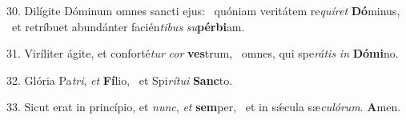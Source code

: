 30. Dilígite Dóminum omnes sancti ejus: \dag\  quóniam veritátem re\textit{quí}\textit{ret} \textbf{Dó}minus, \ast\  et retríbuet abundánter facién\textit{ti}\textit{bus} \textit{su}\textbf{pér}\textbf{bi}am.\

31. Viríliter ágite, et conforté\textit{tur} \textit{cor} \textbf{ves}trum, \ast\  omnes, qui spe\textit{rá}\textit{tis} \textit{in} \textbf{Dó}\textbf{mi}no.\

32. Glória Pa\textit{tri}, \textit{et} \textbf{Fí}lio, \ast\  et Spi\textit{rí}\textit{tu}\textit{i} \textbf{Sanc}to.\

33. Sicut erat in princípio, et \textit{nunc}, \textit{et} \textbf{sem}per, \ast\  et in sǽcula sæ\textit{cu}\textit{ló}\textit{rum}. \textbf{A}men.\


